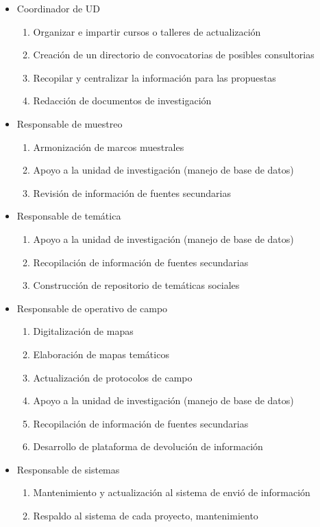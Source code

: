 \documentclass{article}
\begin{document}
\begin{itemize}
\item Coordinador de UD
\begin{enumerate}
\item Organizar e impartir cursos o talleres de actualización
\item Creación de un directorio de convocatorias de posibles consultorias
\item Recopilar y centralizar la información para las propuestas
\item Redacción de documentos de investigación 
\end{enumerate}
\item Responsable de muestreo
\begin{enumerate}
\item Armonización de marcos muestrales
\item Apoyo a la unidad de investigación (manejo de base de datos)
\item Revisión de información de fuentes secundarias 
\end{enumerate} 
\item Responsable de temática
\begin{enumerate}
\item Apoyo a la unidad de investigación (manejo de base de datos)
\item Recopilación de información de fuentes secundarias 
\item Construcción de repositorio de temáticas sociales
\end{enumerate} 
\item Responsable de operativo de campo
\begin{enumerate}
\item Digitalización de mapas
\item Elaboración de mapas temáticos
\item Actualización de protocolos de campo 
\item Apoyo a la unidad de investigación (manejo de base de datos)
\item Recopilación de información de fuentes secundarias 
\item Desarrollo de plataforma de devolución de información
\end{enumerate} 
\item Responsable de sistemas
\begin{enumerate}
\item Mantenimiento y actualización al sistema de envió de información
\item Respaldo al sistema de cada proyecto, mantenimiento 

\end{enumerate}
\end{itemize}
\end{document}
